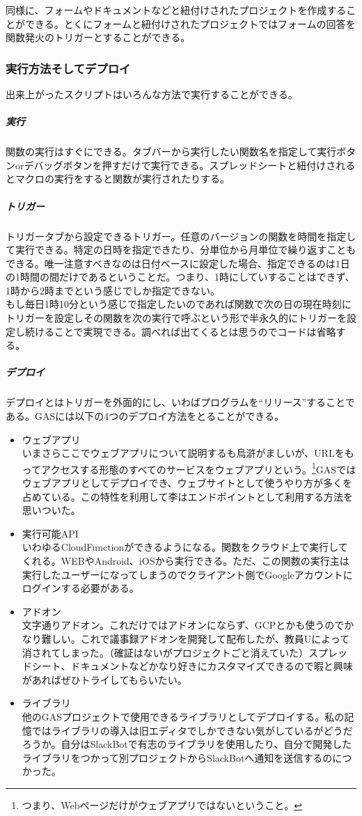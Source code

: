 \documentclass[a4paper]{ltjsreport}
\begin{document}
同様に、フォームやドキュメントなどと紐付けされたプロジェクトを作成することができる。とくにフォームと紐付けされたプロジェクトではフォームの回答を関数発火のトリガーとすることができる。

\subsubsection{実行方法そしてデプロイ}
出来上がったスクリプトはいろんな方法で実行することができる。
\subparagraph{実行}
関数の実行はすぐにできる。タブバーから実行したい関数名を指定して実行ボタンorデバッグボタンを押すだけで実行できる。スプレッドシートと紐付けされるとマクロの実行をすると関数が実行されたりする。

\subparagraph{トリガー}
トリガータブから設定できるトリガー。任意のバージョンの関数を時間を指定して実行できる。特定の日時を指定できたり、分単位から月単位で繰り返すこともできる。唯一注意すべきなのは日付ベースに設定した場合、指定できるのは1日の1時間の間だけであるということだ。つまり、1時にしていすることはできず、1時から2時までという感じでしか指定できない。
\\

もし毎日1時10分という感じで指定したいのであれば関数で次の日の現在時刻にトリガーを設定しその関数を次の実行で呼ぶという形で半永久的にトリガーを設定し続けることで実現できる。調べれば出てくるとは思うのでコードは省略する。

\subparagraph{デプロイ}
デプロイとはトリガーを外面的にし、いわばプログラムを``リリース''することである。GASには以下の4つのデプロイ方法をとることができる。
\begin{itemize}
  \item ウェブアプリ\\
        いまさらここでウェブアプリについて説明するも烏滸がましいが、URLをもってアクセスする形態のすべてのサービスをウェブアプリという。\footnote{つまり、Webページだけがウェブアプリではないということ。}GASではウェブアプリとしてデプロイでき、ウェブサイトとして使うやり方が多くを占めている。この特性を利用して李はエンドポイントとして利用する方法を思いついた。
  \item 実行可能API\\
        いわゆるCloudFunctionができるようになる。関数をクラウド上で実行してくれる。WEBやAndroid、iOSから実行できる。ただ、この関数の実行主は実行したユーザーになってしまうのでクライアント側でGoogleアカウントにログインする必要がある。
  \item アドオン\\
        文字通りアドオン。これだけではアドオンにならず、GCPとかも使うのでかなり難しい。これで議事録アドオンを開発して配布したが、教員Uによって消されてしまった。（確証はないがプロジェクトごと消えていた）スプレッドシート、ドキュメントなどかなり好きにカスタマイズできるので暇と興味があればぜひトライしてもらいたい。
  \item ライブラリ\\
        他のGASプロジェクトで使用できるライブラリとしてデプロイする。私の記憶ではライブラリの導入は旧エディタでしかできない気がしているがどうだろうか。自分はSlackBotで有志のライブラリを使用したり、自分で開発したライブラリをつかって別プロジェクトからSlackBotへ通知を送信するのにつかった。
\end{itemize}
\end{document}
